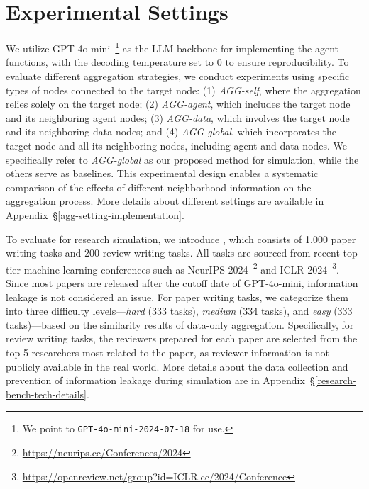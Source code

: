 \section{Experimental Settings}



We utilize GPT-4o-mini~\footnote{We point to \texttt{GPT-4o-mini-2024-07-18} for use.} as the LLM backbone for implementing the agent functions, with the decoding temperature set to \( 0 \) to ensure reproducibility. To evaluate different aggregation strategies, we conduct experiments using specific types of nodes connected to the target node: (1) \textit{AGG-self}, where the aggregation relies solely on the target node; (2) \textit{AGG-agent}, which includes the target node and its neighboring agent nodes; (3) \textit{AGG-data}, which involves the target node and its neighboring data nodes; and (4) \textit{AGG-global}, which incorporates the target node and all its neighboring nodes, including agent and data nodes. We specifically refer to \textit{AGG-global} as our proposed \envname method for simulation, while the others serve as baselines. This experimental design enables a systematic comparison of the effects of different neighborhood information on the aggregation process. More details about different settings are available in Appendix~\S\ref{agg-setting-implementation}.
\label{researchtown-setting}

 To evaluate \envname for research simulation, we introduce \benchname, which consists of 1,000 paper writing tasks and 200 review writing tasks. All tasks are sourced from recent top-tier machine learning conferences such as NeurIPS 2024~\footnote{\url{https://neurips.cc/Conferences/2024}} and ICLR 2024~\footnote{\url{https://openreview.net/group?id=ICLR.cc/2024/Conference}}. Since most papers are released after the cutoff date of GPT-4o-mini, information leakage is not considered an issue. For paper writing tasks, we categorize them into three difficulty levels—\textit{hard} (333 tasks), \textit{medium} (334 tasks), and \textit{easy} (333 tasks)—based on the similarity results of data-only aggregation. Specifically, for review writing tasks, the reviewers prepared for each paper are selected from the top 5 researchers most related to the paper, as reviewer information is not publicly available in the real world. More details about the data collection and prevention of information leakage during simulation are in Appendix~\S\ref{research-bench-tech-details}.
\label{researchbench-setting}
